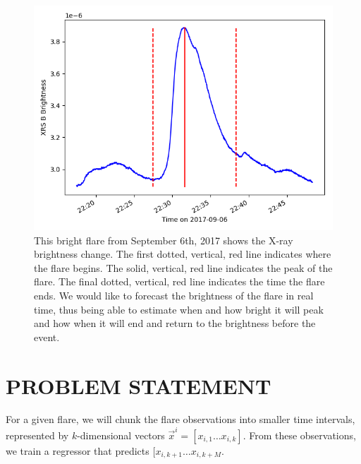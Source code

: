 \documentclass[letterpaper, 10 pt, onecolumn]{ieeeconf}
\begin{document}
\begin{figure}[h!]
    \centering
    \includegraphics[scale=0.75]{flare_example.png}
    \caption{This bright flare from September 6th, 2017 shows the X-ray brightness change. The first dotted, vertical, red line indicates where the flare begins. The solid, vertical, red line indicates the peak of the flare. The final dotted, vertical, red line indicates the time the flare ends. We would like to forecast the brightness of the flare in real time, thus being able to estimate when and how bright it will peak and how when it will end and return to the brightness before the event.} 
    \label{fig:example}
\end{figure}

\section{PROBLEM STATEMENT}

For a given flare, we will chunk the flare observations into smaller time intervals, represented by $k$-dimensional vectors $\vec{x}^i = [x_{i,1} \hdots x_{i, k}]$. From these observations, we train a regressor that predicts $[x_{i,k+1} \hdots x_{i, k+M}$. 
\end{document}
